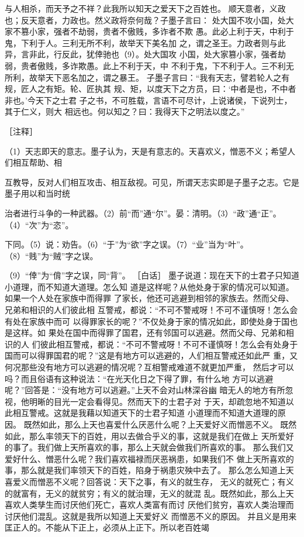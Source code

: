 \documentclass[12pt,UTF8]{ctexbook}
\begin{document}
与人相杀，而天予之不祥？此我所以知天之爱天下之百姓也。 
顺天意者，义政也；反天意者，力政也。然义政将奈何哉？子墨子言曰： 
处大国不攻小国，处大家不篡小家，强者不劫弱，贵者不傲贱，多诈者不欺 
愚。此必上利于天，中利于鬼，下利于人。三利无所不利，故举天下美名加 
之，谓之圣王。力政者则与此异，言非此，行反此，犹倖驰也（9）。处大国攻 
小国，处大家篡小家，强者劫弱，贵者傲贱，多诈欺愚。此上不利于天，中 
不利于鬼，下不利于人。三不利无所利，故举天下恶名加之，谓之暴王。 
子墨子言曰：“我有天志，譬若轮人之有规，匠人之有矩。轮、匠执其 
规、矩，以度天下之方员，曰：‘中者是也，不中者非也。’今天下之士君 
子之书，不可胜载，言语不可尽计，上说诸侯，下说列士，其于仁义，则大 
相远也。何以知之？曰：我得天下之明法以度之。” 


［注释］ 

（1）天志即天的意志。墨子认为，天是有意志的。天喜欢义，憎恶不义；希望人们相互帮助、相 

互教导，反对人们相互攻击、相互敌视。可见，所谓天志实即是子墨子之志。它是墨子用以和当时统 

治者进行斗争的一种武器。（2）前“而”通“尔”。晏：清明。（3）“政”通“正”。（4）“次”为“恣”。 

下同。（5）说：劝告。（6）“于”为“欲”字之误。（7）“业”当为“叶”。（8）“贱”为“贼”字之误。 

（9）“倖”为“偝”字之误，同“背”。 
［白话］ 
墨子说道：现在天下的士君子只知道小道理，而不知道大道理。怎么知 
道是这样呢？从他处身于家的情况可以知道。如果一个人处在家族中而得罪 
了家长，他还可逃避到相邻的家族去。然而父母、兄弟和相识的人们彼此相 
互警戒，都说：“不可不警戒呀！不可不谨慎呀！怎么会有处在家族中而可 
以得罪家长的呢？”不仅处身于家的情况如此，即使处身于国也是这样。如 
果处在国中而得罪了国君，还有邻国可以逃避。然而父母、兄弟和相识的人 
们彼此相互警戒，都说：“不可不警戒呀！不可不谨慎呀！怎么会有处身于 
国而可以得罪国君的呢？”这是有地方可以逃避的，人们相互警戒还如此严 
重，又何况那些没有地方可以逃避的情况呢？互相警戒难道不就更加严重， 
然后才可以吗？而且俗语有这种说法：“在光天化日之下得了罪，有什么地 
方可以逃避呢？”回答是：“没有地方可以逃避。”上天不会对山林深谷幽 
暗无人的地方有所忽视，他明晰的目光一定会看得见。然而天下的士君子对 
于天，却疏忽地不知道以此相互警戒。这就是我藉以知道天下的士君子知道 
小道理而不知道大道理的原因。 
既然如此，那么上天也喜爱什么厌恶什么呢？上天爱好义而憎恶不义。 
既然如此，那么率领天下的百姓，用以去做合乎义的事，这就是我们在做上 
天所爱好的事了。我们做上天所喜欢的事，那么上天就会做我们所喜欢的事。 
那么我们又爱好什么、憎恶什么呢？我们喜欢福禄而厌恶祸患，如果我们不 
做上天所喜欢的事，那么就是我们率领天下的百姓，陷身于祸患灾殃中去了。 
那么怎么知道上天喜爱义而憎恶不义呢？回答说：天下之事，有义的就生存， 
无义的就死亡；有义的就富有，无义的就贫穷；有义的就治理，无义的就混 
乱。既然如此，那么上天喜欢人类孳生而讨厌他们死亡，喜欢人类富有而讨 
厌他们贫穷，喜欢人类治理而讨厌他们混乱。这就是我所以知道上天爱好义 
而憎恶不义的原因。 
并且义是用来匡正人的。不能从下正上，必须从上正下。所以老百姓竭 
\end{document}
